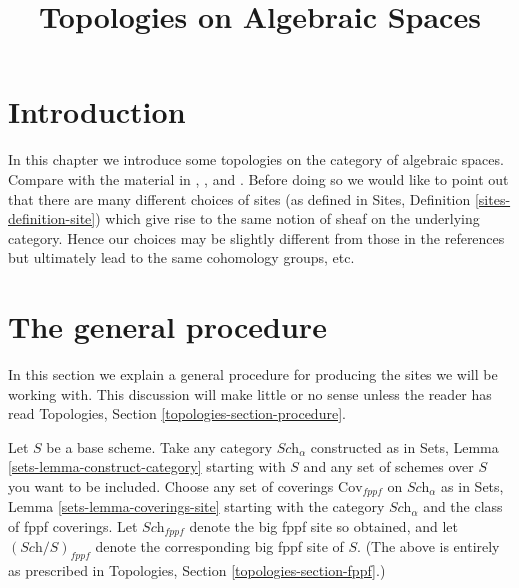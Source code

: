 

%


\title{Topologies on Algebraic Spaces}

\maketitle

\label{section-phantom}

\tableofcontents




\section{Introduction}
\label{section-introduction}

\noindent
In this chapter we introduce some topologies on the
category of algebraic spaces. Compare with the material in \cite{SGA1},
\cite{Ner}, \cite{LM-B} and \cite{Kn}.
Before doing so we would like to point out that there
are many different choices of sites (as defined in
Sites, Definition \ref{sites-definition-site}) which give rise to
the same notion of sheaf on the underlying category. Hence
our choices may be slightly different from those in the references
but ultimately lead to the same cohomology groups, etc.




\section{The general procedure}
\label{section-procedure}

\noindent
In this section we explain a general procedure for producing the
sites we will be working with. This discussion will make little or
no sense unless the reader has read
Topologies, Section \ref{topologies-section-procedure}.

\medskip\noindent
Let $S$ be a base scheme.
Take any category $\textit{Sch}_\alpha$ constructed as in
Sets, Lemma \ref{sets-lemma-construct-category} starting with
$S$ and any set of schemes over $S$ you want to be included.
Choose any set of
coverings $\text{Cov}_{fppf}$ on $\textit{Sch}_\alpha$ as in
Sets, Lemma \ref{sets-lemma-coverings-site}
starting with the category $\textit{Sch}_\alpha$ and the class of fppf
coverings. Let $\textit{Sch}_{fppf}$ denote the big fppf site so
obtained, and let $(\textit{Sch}/S)_{fppf}$ denote the corresponding
big fppf site of $S$. (The above is entirely as prescribed in Topologies,
Section \ref{topologies-section-fppf}.)

